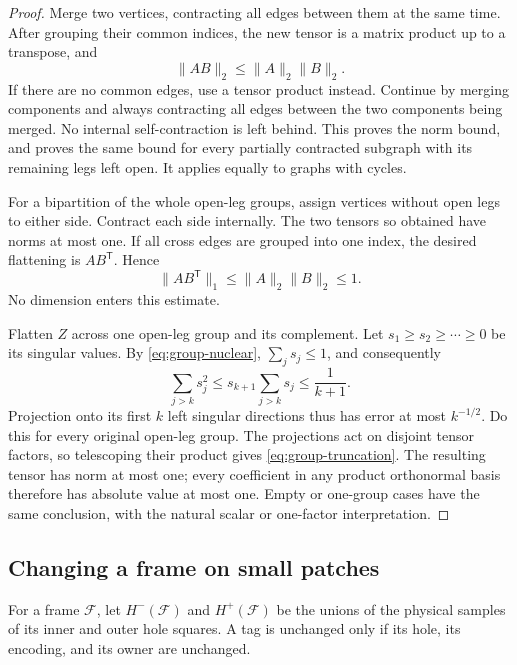 \documentclass[11pt]{article}
\numberwithin{equation}{section}
\theoremstyle{definition}
\theoremstyle{remark}
\begin{document}
\begin{proof}
Merge two vertices, contracting all edges between them at the same time.
After grouping their common indices, the new tensor is a matrix product
up to a transpose, and
\[
  \lVert AB\rVert_2\le\lVert A\rVert_2\lVert B\rVert_2.
\]
If there are no common edges, use a tensor product instead.  Continue by
merging components and always contracting all edges between the two
components being merged.  No internal self-contraction is left behind.
This proves the norm bound, and proves the same bound for every partially
contracted subgraph with its remaining legs left open.  It applies equally
to graphs with cycles.

For a bipartition of the whole open-leg groups, assign vertices without
open legs to either side.  Contract each side internally.  The two tensors
so obtained have norms at most one.  If all cross edges are grouped into
one index, the desired flattening is $AB^{\mathsf T}$.  Hence
\begin{equation}\label{eq:group-nuclear}
  \lVert AB^{\mathsf T}\rVert_1\le\lVert A\rVert_2\lVert B\rVert_2\le1.
\end{equation}
No dimension enters this estimate.

Flatten $Z$ across one open-leg group and its complement.  Let
$s_1\ge s_2\ge\cdots\ge0$ be its singular values.  By
\eqref{eq:group-nuclear}, $\sum_js_j\le1$, and consequently
\[
 \sum_{j>k}s_j^2
     \le s_{k+1}\sum_{j>k}s_j\le\frac{1}{k+1}.
\]
Projection onto its first $k$ left singular directions thus has error at
most $k^{-1/2}$.  Do this for every original open-leg group.  The projections
act on disjoint tensor factors, so telescoping their product gives
\eqref{eq:group-truncation}.  The resulting tensor has norm at most one;
every coefficient in any product orthonormal basis therefore has absolute
value at most one.  Empty or one-group cases have the same conclusion,
with the natural scalar or one-factor interpretation.
\end{proof}

\subsection{Changing a frame on small patches}

For a frame $\mathcal F$, let $H^-(\mathcal F)$ and $H^+(\mathcal F)$ be the
unions of the physical samples of its inner and outer hole squares.  A tag
is unchanged only if its hole, its encoding, and its owner are unchanged.
\end{document}
